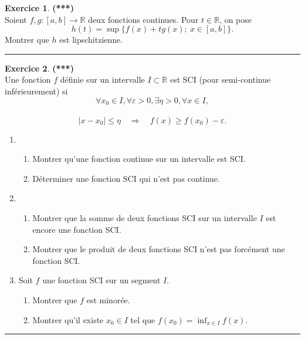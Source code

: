 \documentclass[a4paper,11pt]{article}
\theoremstyle{definition}
\newtheorem{exo}{Exercice} %
\begin{document}
\begin{minipage}[t]{1\linewidth}
\begin{minipage}[t]{0.48\linewidth}
	
	\begin{exo}\textbf{(***)}\quad\\[0.2cm]
	Soient $f,g:[a,b]\to\mathbb R$ deux fonctions continues. Pour $t\in\mathbb R$, on pose
	$$h(t)=\sup\{f(x)+tg(x);\ x\in[a,b]\}.$$
	Montrer que $h$ est lipschitzienne.
	
				\centering
	\rule{1\linewidth}{0.6pt}
\end{exo}

	\begin{exo}\textbf{(***)}\quad\\[0.2cm]
	Une fonction $f$ définie sur un intervalle $I \subset \mathbb{R}$ est SCI (pour semi-continue inférieurement) si\\[-0.4cm]
	
	 $$\forall x_{0} \in I, \forall \varepsilon>0, \exists \eta>0, \forall x \in I,$$\\[-0.8cm]
	
	$$ \left|x-x_{0}\right| \leq \eta \quad \Rightarrow \quad f(x) \geq f\left(x_{0}\right)-\varepsilon .
	$$
	\begin{enumerate}
		\item
		\begin{enumerate}
			\item Montrer qu'une fonction continue sur un intervalle est SCI.
			\item Déterminer une fonction SCI qui n'est pas continue.
		\end{enumerate}
	\item
	\begin{enumerate}
		\item Montrer que la somme de deux fonctions SCI sur un intervalle $I$ est encore une fonction SCI.
		\item Montrer que le produit de deux fonctions SCI n'est pas forcément une fonction SCI.
	\end{enumerate}

		\item Soit $f$ une fonction SCI sur un segment $I$.
	\begin{enumerate}
		\item Montrer que $f$ est minorée.
		\item Montrer qu'il existe $x_{0} \in I$ tel que $f\left(x_{0}\right)=\inf _{x \in I} f(x)$.
	\end{enumerate}
	\end{enumerate}

				\centering
\rule{1\linewidth}{0.6pt}

\end{exo}	
		
		
	\end{minipage}
\end{minipage}
\end{document}
